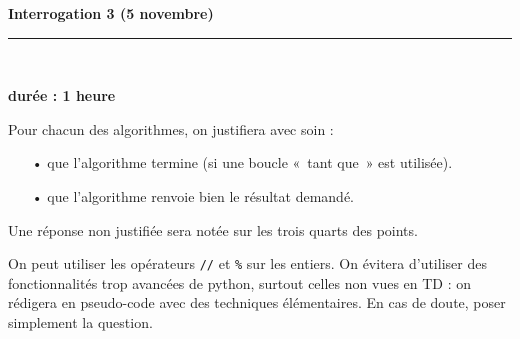 \documentclass[11pt,a4paper]{article}
\title{}
\date{}
\newcommand{\HRule}{\rule{\linewidth}{0.5mm}}
\begin{document}
\pagestyle{fancy}

\fancyhead{}
 \fancyfoot{}


\newcommand{\lb}{\llbracket}
\newcommand{\rb}{\rrbracket}
\newcommand{\N}{\mathbb{N}}
\newcommand{\Z}{\mathbb{Z}}
\newcommand{\R}{\mathbb{R}}




\newcommand{\md}[3]{#1\ \equiv \ #2 \! \! \! \! \! \pmod {#3} }
\newcommand{\nmd}[3]{#1 \not \equiv #2 \! \! \! \! \!  \pmod {#3} }
\newcommand{\mda}[3]{#1 \equiv #2 \! \!  \pmod {#3} }
\newcommand{\nmda}[3]{#1 \not \equiv #2 \! \! \pmod {#3} }
\newcommand{\mo}[2]{#1 \! \! \! \! \! \pmod #2 }
\newcommand{\moa}[2]{#1 \! \!  \pmod {#2} }

\thispagestyle{fancy}

\begin{center}
    { \huge \bfseries
Interrogation 3 (5 novembre)
     \\ [0cm] }
    \HRule \\[0.5cm]
\end{center}

\begin{center}
\textbf{durée : 1 heure}
\end{center}



Pour chacun des algorithmes, on justifiera avec soin : \begin{itemize}
\item[•] que l'algorithme termine (si une boucle «~tant que~» est utilisée).

\item[•] que l'algorithme renvoie bien le résultat demandé.
\end{itemize}

Une réponse non justifiée sera notée sur les trois quarts des points.

On peut utiliser les opérateurs \verb+//+ et \verb+%+ sur les entiers. On évitera d'utiliser des fonctionnalités trop avancées de python, surtout celles non vues en TD : on rédigera en pseudo-code avec des techniques élémentaires. En cas de doute, poser simplement la question.
\end{document}
